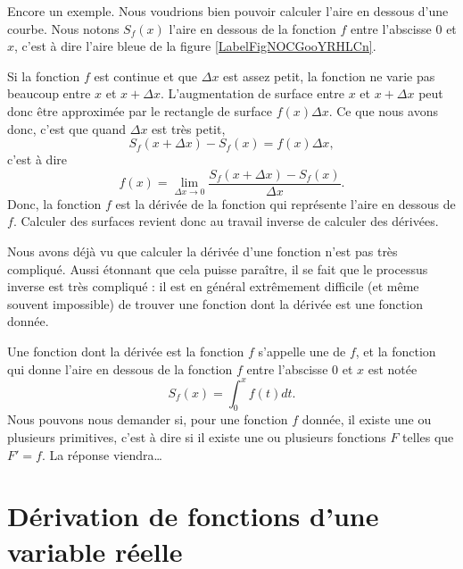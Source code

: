 Encore un exemple. Nous voudrions bien pouvoir calculer l'aire en dessous d'une courbe. Nous notons $S_f(x)$ l'aire en dessous de la fonction $f$ entre l'abscisse $0$ et $x$, c'est à dire l'aire bleue de la figure \ref{LabelFigNOCGooYRHLCn}. %
\newcommand{\CaptionFigNOCGooYRHLCn}{L'aire en dessous d'une courbe. Le rectangle rouge d'aire $f(x)\Delta x$ approxime de combien la surface augmente lorsqu'on passe de $x$ à $x+\Delta x$.}


Si la fonction $f$ est continue et que $\Delta x$ est assez petit, la fonction ne varie pas beaucoup entre $x$ et $x+\Delta x$. L'augmentation de surface entre $x$ et $x+\Delta x$ peut donc être approximée par le rectangle de surface $f(x)\Delta x$. Ce que nous avons donc, c'est que quand $\Delta x$ est très petit,
\begin{equation}
	S_f(x+\Delta x)-S_f(x)=f(x)\Delta x,
\end{equation}
c'est à dire
\begin{equation}
	f(x)=\lim_{\Delta x\to 0}\frac{  S_f(x+\Delta x)-S_f(x)}{ \Delta x }.
\end{equation}
Donc, la fonction $f$ est la dérivée de la fonction qui représente l'aire en dessous de $f$. Calculer des surfaces revient donc au travail inverse de calculer des dérivées.

Nous avons déjà vu que calculer la dérivée d'une fonction n'est pas très compliqué. Aussi étonnant que cela puisse paraître, il se fait que le processus inverse est très compliqué : il est en général extrêmement difficile (et même souvent impossible) de trouver une fonction dont la dérivée est une fonction donnée.

Une fonction dont la dérivée est la fonction $f$ s'appelle une  de $f$, et la fonction qui donne l'aire en dessous de la fonction $f$ entre l'abscisse $0$ et $x$ est notée
\begin{equation}
	S_f(x)=\int_0^xf(t)dt.
\end{equation}
Nous pouvons nous demander si, pour une fonction $f$ donnée, il existe une ou plusieurs primitives, c'est à dire si il existe une ou plusieurs fonctions $F$ telles que $F'=f$. La réponse viendra\ldots


\section{Dérivation de fonctions d'une variable réelle}
